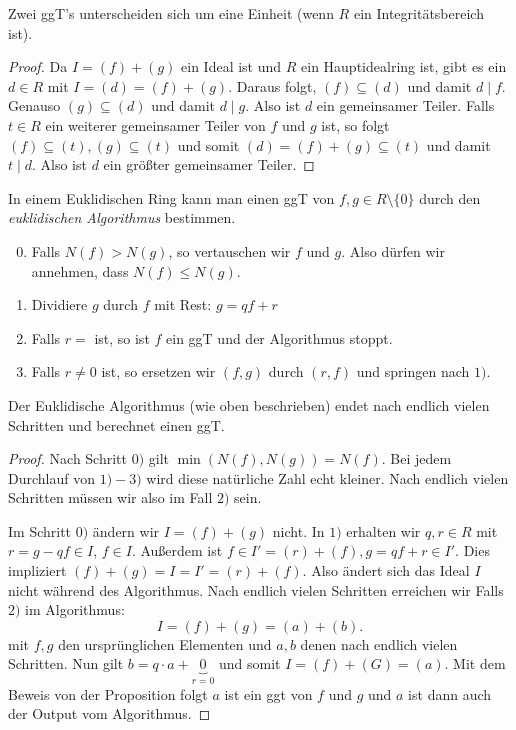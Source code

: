 \begin{remark}
	Zwei ggT's unterscheiden sich um eine Einheit (wenn $R$ ein Integritätsbereich ist).
\end{remark}

\begin{proof}
	Da $I = (f) + (g)$ ein Ideal ist und $R$ ein Hauptidealring ist, gibt es ein $d \in R$ mit $I = (d) = (f) + (g)$.
	Daraus folgt, $(f) \subseteq (d)$ und damit $d \mid f$. Genauso $(g) \subseteq (d)$ und damit $d \mid g$.
	Also ist $d$ ein gemeinsamer Teiler.
	Falls $t \in R$ ein weiterer gemeinsamer Teiler von $f$ und $g$ ist, so folgt $(f) \subseteq (t), (g) \subseteq (t)$ und somit
	$(d) = (f) + (g) \subseteq (t)$ und damit $t \mid d$.
	Also ist $d$ ein größter gemeinsamer Teiler.
\end{proof}

In einem Euklidischen Ring kann man einen ggT von $f,g \in R \setminus \{0\} $ durch den \emph{euklidischen Algorithmus} bestimmen.
\begin{enumerate}[1)]
	\setcounter{enumi}{-1}
	\item Falls $N(f) > N(g)$, so vertauschen wir $f$ und $g$. 
		Also dürfen wir annehmen, dass $N(f) \leq N(g)$.
	\item Dividiere $g$ durch $f$ mit Rest: $g = q f + r$
	\item Falls $r = $ ist, so ist $f$ ein ggT und der Algorithmus stoppt.
	\item Falls $r\neq 0$ ist, so ersetzen wir $(f,g)$ durch $(r,f)$ und springen nach $1)$.
\end{enumerate}

\begin{lemma}
	Der Euklidische Algorithmus (wie oben beschrieben) endet nach endlich vielen Schritten und berechnet einen ggT.
\end{lemma}

\begin{proof}
	Nach Schritt $0)$ gilt $\min(N(f), N(g)) = N(f)$. 
	Bei jedem Durchlauf von $1)-3)$ wird diese natürliche Zahl echt kleiner.
	Nach endlich vielen Schritten müssen wir also im Fall $2)$ sein.

	Im Schritt $0)$ ändern wir $I = (f) + (g)$ nicht.
	In $1)$ erhalten wir $q,r \in R$ mit $r = g- qf \in I$, $f \in I$.
	Außerdem ist $f \in I' = (r) + (f), g = qf + r \in I'$.
	Dies impliziert $(f) + (g) = I = I' = (r)+(f)$.
	Also ändert sich das Ideal $I$ nicht während des Algorithmus.
	Nach endlich vielen Schritten erreichen wir Falls $2)$ im Algorithmus:
	\[
		I = (f) + (g) = (a) + (b)
	.\] 
	mit $f,g$ den ursprünglichen Elementen und $a,b$ denen nach endlich vielen Schritten.
	Nun gilt $b = q \cdot a + \underbrace{0}_{r=0}$ und somit $I = (f) + (G) = (a)$.
	Mit dem Beweis von der Proposition folgt $a$ ist ein ggt von $f$ und $g$ und $a$ ist dann auch der Output vom Algorithmus.
\end{proof}

